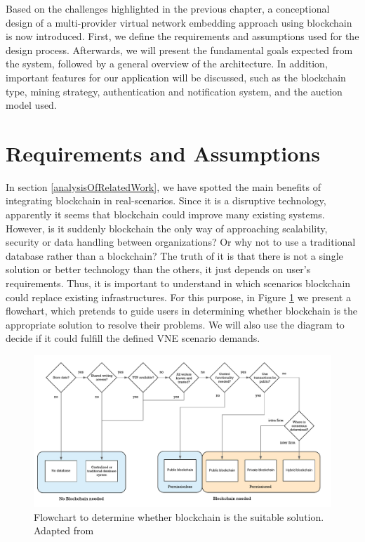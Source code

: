 Based on the challenges highlighted in the previous chapter, a conceptional design of a multi-provider virtual network embedding approach using blockchain is now introduced. First, we define the requirements and assumptions used for the design process. Afterwards, we will present the fundamental goals expected from the system, followed by a general overview of the architecture. In addition, important features for our application will be discussed, such as the blockchain type, mining strategy, authentication and notification system, and the auction model used.

\section{Requirements and Assumptions}

In section \ref{analysisOfRelatedWork}, we have spotted the main benefits of integrating blockchain in real-scenarios. Since it is a disruptive technology, apparently it seems that blockchain could improve many existing systems. However, is it suddenly blockchain the only way of approaching scalability, security or data handling between organizations? Or why not to use a traditional database rather than a blockchain? The truth of it is that there is not a single solution or better technology than the others, it just depends on user's requirements. Thus, it is important to understand in which scenarios blockchain could replace existing infrastructures. For this purpose, in Figure \ref{fig:bcFlowchart} we present a flowchart, which pretends to guide users in determining whether blockchain is the appropriate solution to resolve their problems. We will also use the diagram to decide if it could fulfill the defined VNE scenario demands. 

\begin{figure}[bth]
	\centering
	\includegraphics[width=1\linewidth]{gfx/bcFlowchart}    
  	\caption{Flowchart to determine whether blockchain is the suitable solution. Adapted from \citep{wust2017you}}
  	\label{fig:bcFlowchart}
\end{figure}

